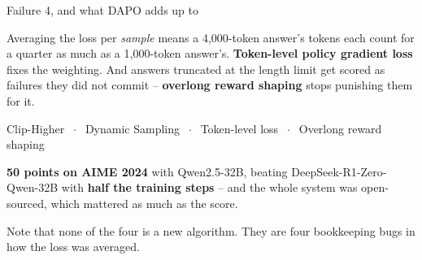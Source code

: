 \documentclass[aspectratio=169]{beamer}
\begin{document}
\begin{frame}{Failure 4, and what DAPO adds up to}
  \small
  \begin{tcolorbox}[colback=armred!8, colframe=armred, boxrule=0.6pt, arc=2pt,
                    title={\textbf{Long chains dilute the signal}}]
    \small
    Averaging the loss per \emph{sample} means a 4{,}000-token answer's tokens each count for a
    quarter as much as a 1{,}000-token answer's. \textbf{Token-level policy gradient loss} fixes
    the weighting. And answers truncated at the length limit get scored as failures they did not
    commit -- \textbf{overlong reward shaping} stops punishing them for it.
  \end{tcolorbox}

  \vskip 8pt
  \begin{center}
  \begin{tcolorbox}[colback=paramgreen!8, colframe=paramgreen, boxrule=0.8pt, arc=2pt,
                    width=0.94\textwidth,
                    title={\textbf{DAPO} -- Decoupled Clip and Dynamic Sampling Policy Optimization (ByteDance Seed \& Tsinghua, 2025)}]
    \small
    Clip-Higher $\;\cdot\;$ Dynamic Sampling $\;\cdot\;$ Token-level loss $\;\cdot\;$ Overlong
    reward shaping

    \vskip 4pt
    \textbf{50 points on AIME 2024} with Qwen2.5-32B, beating DeepSeek-R1-Zero-Qwen-32B with
    \textbf{half the training steps} -- and the whole system was open-sourced, which mattered as
    much as the score.
  \end{tcolorbox}
  \end{center}

  \vskip 6pt
  \begin{center}
    \small
    Note that none of the four is a new algorithm. They are four bookkeeping bugs in how the
    loss was averaged.
  \end{center}
\end{frame}
\end{document}
